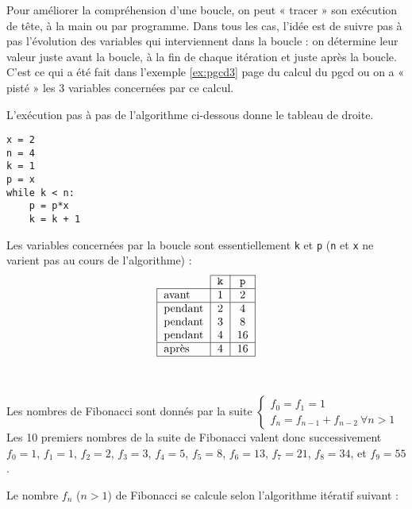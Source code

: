 Pour améliorer la compréhension d'une boucle, on peut « tracer » son exécution de tête,
à la main ou par programme. Dans tous les cas, l'idée est de suivre pas à pas
l'évolution des variables qui interviennent dans la boucle : on détermine leur valeur 
juste avant la boucle, à la fin de chaque itération et juste après la boucle.
C'est ce qui a été fait dans l'exemple \ref{ex:pgcd3} page \pageref{ex:pgcd3} du calcul
du pgcd ou on a « pisté » les 3 variables concernées par ce calcul.

\begin{ex}\label{ex:execBoucle}
L'exécution pas à pas de l'algorithme ci-dessous donne le tableau
de droite.

\begin{py}{4cm}
\begin{verbatim}
x = 2
n = 4
k = 1
p = x
while k < n:
    p = p*x
    k = k + 1
\end{verbatim}
\end{py}
\hfill
\begin{py}{10cm}
Les variables concernées par la boucle sont essentiellement {\tt k} et {\tt p} 
({\tt n} et {\tt x} ne varient pas  au cours de l'algorithme) :
$$\begin{tabular}{|l|c|c|}
\cline{2-3}
\multicolumn{1}{c|}{} & \tt k & \tt p \\
\hline
avant & 1 & 2 \\
\hline
pendant & 2 & 4 \\
pendant & 3 & 8 \\
pendant & 4 & 16\\
\hline
après & 4 & 16\\
\hline
\end{tabular}$$
\end{py}\\
\end{ex}

\begin{ex}\label{ex:fibonacci}
Les nombres de Fibonacci sont donnés par la suite
$\displaystyle \left\{\begin{array}{l}
f_0 = f_1 = 1\\
f_n = f_{n-1} + f_{n-2}\ \forall n > 1
\end{array}\right.$ \\
Les 10 premiers nombres de la suite de Fibonacci valent donc
successivement $f_0 = 1$, $f_1 = 1$, $f_2 = 2$, $f_3 = 3$, 
$f_4 = 5$, $f_5 = 8$, $f_6 = 13$, $f_7 = 21$, $f_8 = 34$, et $f_9 = 55$.
\end{ex}
\noindent Le nombre $f_n$ ($n > 1$) de Fibonacci se calcule selon l'algorithme itératif
suivant :

